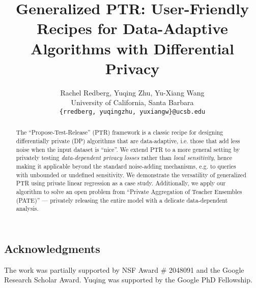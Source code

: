 \documentclass[11pt]{article}
\title{Generalized PTR: User-Friendly Recipes for Data-Adaptive Algorithms with Differential Privacy}
\author{Rachel Redberg, Yuqing Zhu, Yu-Xiang Wang \\
University of California, Santa Barbara\\
\texttt{\{rredberg, yuqingzhu, yuxiangw\}@ucsb.edu} \\
}
\theoremstyle{plain}
\theoremstyle{definition}
\theoremstyle{plain}
\begin{document}
\maketitle



\begin{abstract}
    The ``Propose-Test-Release'' (PTR) framework \citep{dwork2009differential} is a classic recipe for designing differentially private (DP) algorithms that are data-adaptive, i.e. those that  add less noise when the input dataset is ``nice''. We extend PTR to a more general setting by privately testing \emph{data-dependent privacy losses} rather than \emph{local sensitivity}, hence making it applicable beyond the standard noise-adding mechanisms, e.g. to queries with unbounded or undefined sensitivity. We demonstrate the versatility of generalized PTR using private linear regression as a case study. Additionally, we apply our algorithm to solve an open problem from “Private Aggregation of Teacher Ensembles (PATE)” \citep{papernot2017, papernot2018scalable} --- privately releasing the entire model with a delicate data-dependent analysis.
\end{abstract}


\label{section:introduction}


\label{section:related_work}


\label{section:preliminary}


\label{section:genPTR}


 

 \label{section:applications}



\label{section:conclusion}

\subsection*{Acknowledgments}

The work was partially supported by NSF Award \# 2048091 and the Google Research Scholar Award. Yuqing was supported by the Google PhD Fellowship.


\newpage
\onecolumn

\appendix


 


\end{document}
